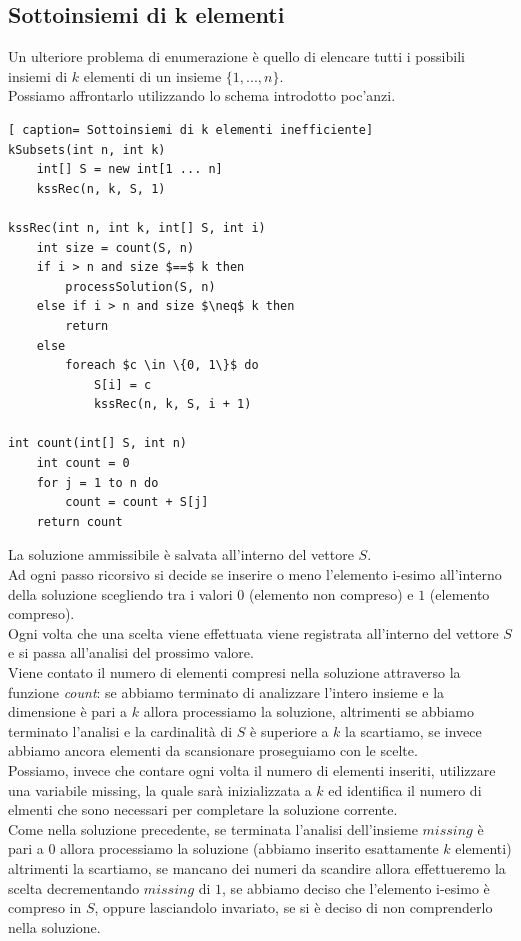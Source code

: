 \documentclass[../cheatSheetAlgoritmi.tex]{subfiles}
\begin{document}
\subsection{Sottoinsiemi di k elementi}
Un ulteriore problema di enumerazione è quello di elencare tutti i possibili insiemi di $k$ elementi di un insieme $\{1, ..., n\}$. \\
Possiamo affrontarlo utilizzando lo schema introdotto poc'anzi.
 \begin{lstlisting}[ caption= Sottoinsiemi di k elementi inefficiente]
kSubsets(int n, int k)
	int[] S = new int[1 ... n]
	kssRec(n, k, S, 1)

kssRec(int n, int k, int[] S, int i)
	int size = count(S, n)
	if i > n and size $==$ k then
		processSolution(S, n)
	else if i > n and size $\neq$ k then
		return 
	else
		foreach $c \in \{0, 1\}$ do
			S[i] = c
			kssRec(n, k, S, i + 1)
			
int count(int[] S, int n)
	int count = 0
	for j = 1 to n do
		count = count + S[j]
	return count
\end{lstlisting}
La soluzione ammissibile è salvata all'interno del vettore $S$. \\
Ad ogni passo ricorsivo si decide se inserire o meno l'elemento i-esimo all'interno della soluzione scegliendo tra i valori $0$ (elemento non compreso) e $1$ (elemento compreso).  \\
Ogni volta che una scelta viene effettuata viene registrata all'interno del vettore $S$ e si passa all'analisi del prossimo valore. \\
Viene contato il numero di elementi compresi nella soluzione attraverso la funzione \emph{count}: se abbiamo terminato di analizzare l'intero insieme e la dimensione è pari a $k$ allora processiamo la soluzione, altrimenti se abbiamo terminato l'analisi e la cardinalità di $S$ è superiore a $k$ la scartiamo, se invece abbiamo ancora elementi da scansionare proseguiamo con le scelte. \\
Possiamo, invece che contare ogni volta il numero di elementi inseriti, utilizzare una variabile missing, la quale sarà inizializzata a $k$ ed identifica il numero di elmenti che sono necessari per completare la soluzione corrente. \\ 
Come nella soluzione precedente, se terminata l'analisi dell'insieme $missing$ è pari a $0$ allora processiamo la soluzione (abbiamo inserito esattamente $k$ elementi) altrimenti la scartiamo, se mancano dei numeri da scandire allora effettueremo la scelta decrementando $missing$ di $1$, se abbiamo deciso che l'elemento i-esimo è compreso in $S$, oppure lasciandolo invariato, se si è deciso di non comprenderlo nella soluzione. 
\end{document}

